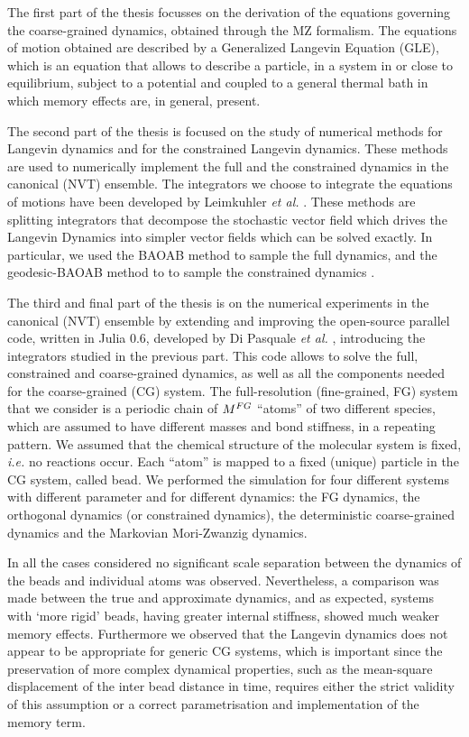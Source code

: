 \documentclass[10pt,a4paper]{article}
\begin{document}
The first part of the thesis focusses on the derivation of the equations governing the coarse-grained dynamics, obtained through the MZ formalism.
The equations of motion obtained are described by a Generalized Langevin Equation (GLE), which is an equation that allows to describe a particle, in a system in or close to equilibrium, subject to a potential and coupled to a general thermal bath in which memory effects are, in general, present.

The second part of the thesis is focused on the study of numerical methods for Langevin dynamics and for the constrained Langevin dynamics. These methods are used to numerically implement the full and the constrained dynamics in the canonical (NVT) ensemble. The integrators we choose to integrate the equations of motions have been developed by Leimkuhler \emph{et al.} \cite{LeimMatt:LAnDynInt,Leimkuhler2016}. These methods are splitting integrators that decompose the stochastic vector field which drives the Langevin Dynamics into simpler vector fields which can be solved exactly. In particular, we used the BAOAB method to sample the full dynamics\cite{LeimMatt:LAnDynInt}, and the geodesic-BAOAB method to to sample the constrained dynamics \cite{Leimkuhler2016}.

The third and final part of the thesis is on the numerical experiments in the canonical (NVT) ensemble by extending and improving the open-source parallel code, written in Julia 0.6, developed by Di Pasquale \emph{et al.} \cite{DiPasquale2019}, introducing the integrators studied in the previous part. This code allows to solve the full, constrained and coarse-grained dynamics, as well as all the components needed for the coarse-grained (CG) system.
%
The full-resolution (fine-grained, FG) system that we consider is a periodic chain of $M^{FG}$ ``atoms'' of two different species, which are assumed to have different masses and bond stiffness, in a repeating pattern. We assumed that the chemical structure of the molecular system is fixed, \textit{i.e.} no reactions occur. Each ``atom'' is mapped to a fixed (unique) particle in the CG system, called bead. 
We performed the simulation for four different systems with different parameter and for different dynamics: the FG dynamics, the orthogonal dynamics (or constrained dynamics), the deterministic coarse-grained dynamics and the Markovian Mori-Zwanzig dynamics.

In all the cases considered no significant scale separation between the dynamics of the beads and individual atoms was observed. Nevertheless, a comparison was made between the true and approximate dynamics, and as expected, systems with `more rigid' beads, having greater internal stiffness, showed much weaker memory effects. 
%
Furthermore we observed that the Langevin dynamics does not appear to be appropriate for generic CG systems, which is important since the preservation of more complex dynamical properties, such as the mean-square displacement of the inter bead distance in time, requires either the strict validity of this assumption or a correct parametrisation and implementation of the memory term.





\end{document}
